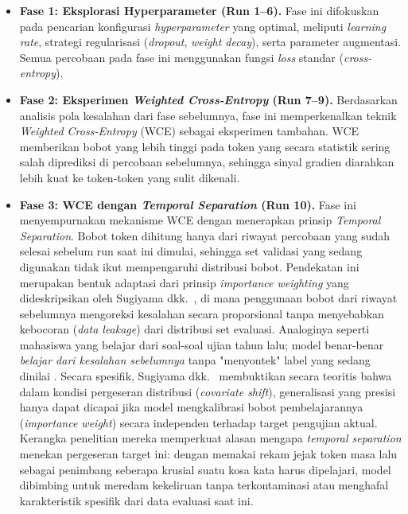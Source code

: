 \begin{itemize}
    \item \textbf{Fase 1: Eksplorasi Hyperparameter (Run 1--6).} Fase ini difokuskan pada pencarian konfigurasi \textit{hyperparameter} yang optimal, meliputi \textit{learning rate}, strategi regularisasi (\textit{dropout}, \textit{weight decay}), serta parameter augmentasi. Semua percobaan pada fase ini menggunakan fungsi \textit{loss} standar (\textit{cross-entropy}).

    \item \textbf{Fase 2: Eksperimen \textit{Weighted Cross-Entropy} (Run 7--9).} Berdasarkan analisis pola kesalahan dari fase sebelumnya, fase ini memperkenalkan teknik \textit{Weighted Cross-Entropy} (WCE) \cite{pineiromartin2024weighted} sebagai eksperimen tambahan. WCE memberikan bobot yang lebih tinggi pada token yang secara statistik sering salah diprediksi di percobaan sebelumnya, sehingga sinyal gradien diarahkan lebih kuat ke token-token yang sulit dikenali.

    \item \textbf{Fase 3: WCE dengan \textit{Temporal Separation} (Run 10).} Fase ini menyempurnakan mekanisme WCE dengan menerapkan prinsip \textit{Temporal Separation}. Bobot token dihitung hanya dari riwayat percobaan yang sudah selesai sebelum run saat ini dimulai, sehingga set validasi yang sedang digunakan tidak ikut mempengaruhi distribusi bobot. Pendekatan ini merupakan bentuk adaptasi dari prinsip \textit{importance weighting} yang dideskripsikan oleh Sugiyama dkk.\ \cite{sugiyama2007covariate}, di mana penggunaan bobot dari riwayat sebelumnya mengoreksi kesalahan secara proporsional tanpa menyebabkan kebocoran (\textit{data leakage}) dari distribusi set evaluasi. Analoginya seperti mahasiswa yang belajar dari soal-soal ujian tahun lalu; model benar-benar \textit{belajar dari kesalahan sebelumnya} tanpa "menyontek" label yang sedang dinilai \cite{pineiromartin2024weighted}. Secara spesifik, Sugiyama dkk.\ \cite{sugiyama2007covariate} membuktikan secara teoritis bahwa dalam kondisi pergeseran distribusi (\textit{covariate shift}), generalisasi yang presisi hanya dapat dicapai jika model mengkalibrasi bobot pembelajarannya (\textit{importance weight}) secara independen terhadap target pengujian aktual. Kerangka penelitian mereka memperkuat alasan mengapa \textit{temporal separation} menekan pergeseran target ini: dengan memakai rekam jejak token masa lalu sebagai penimbang seberapa krusial suatu kosa kata harus dipelajari, model dibimbing untuk meredam kekeliruan tanpa terkontaminasi atau menghafal karakteristik spesifik dari data evaluasi saat ini.
\end{itemize}

